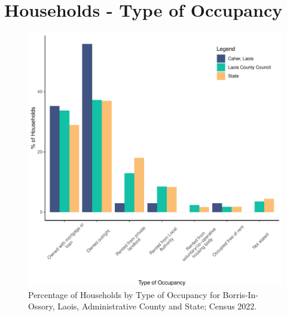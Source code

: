 \documentclass{article}
\begin{document}
\section{Households - Type of Occupancy}\label{sect:Households}
\begin{figure}[H]
	\centering
	\includegraphics[width = 140mm]{../figures/HouseholdsED.pdf}
	\caption{Percentage of Households by Type of Occupancy for Borris-In-Ossory, Laois, Administrative County and State; Census 2022.}
	\label{fig:vbnv}
	\end{figure}
\end{document}
